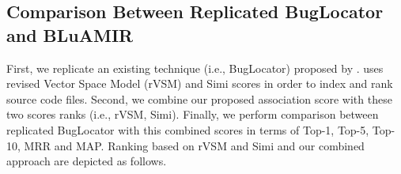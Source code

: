 \documentclass[conference]{IEEEtran}
\begin{document}
\subsection{Comparison Between Replicated BugLocator and BLuAMIR}
First, we replicate an existing technique (i.e., BugLocator) proposed by \citet{Jian}. 
\citet{Jian} uses
revised Vector Space Model (rVSM) and Simi scores in order to index and rank source code files.
Second, we combine our proposed association score with these two scores ranks (i.e., rVSM, Simi). Finally, we perform comparison between replicated BugLocator with this combined scores in terms of Top-1, Top-5, Top-10, MRR and MAP. Ranking based on rVSM and Simi and our combined approach are depicted as follows.
\end{document}
